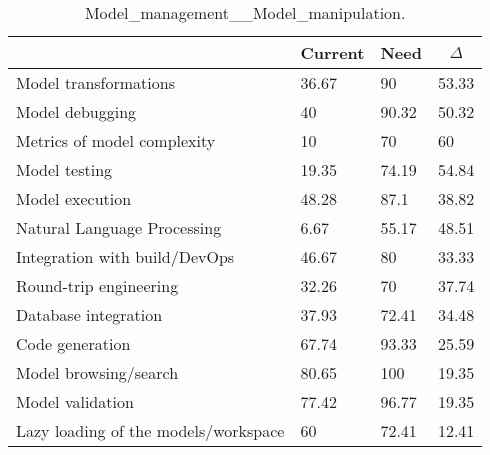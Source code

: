 
  \begin{table*}[]
  \centering
  \notsotiny
  \caption{ Model_management__Model_manipulation.}
\label{tab:model_management__model_manipulation}
\begin{tabular}{|l|l|l|l|}
  \hline
  \rowcolor[HTML]{C0C0C0}
    \multicolumn{1}{|c|}{Feature} & \multicolumn{1}{c|}{Current} & \multicolumn{1}{c|}{Need} & \multicolumn{1}{c|}{$\Delta$} \\ \hline
  Model transformations & 36.67 & 90 & 53.33 \\ \hline 
Model debugging & 40 & 90.32 & 50.32 \\ \hline 
Metrics of model complexity & 10 & 70 & 60 \\ \hline 
Model testing & 19.35 & 74.19 & 54.84 \\ \hline 
Model execution & 48.28 & 87.1 & 38.82 \\ \hline 
Natural Language Processing & 6.67 & 55.17 & 48.51 \\ \hline 
Integration with build/DevOps & 46.67 & 80 & 33.33 \\ \hline 
Round-trip engineering & 32.26 & 70 & 37.74 \\ \hline 
Database integration & 37.93 & 72.41 & 34.48 \\ \hline 
Code generation & 67.74 & 93.33 & 25.59 \\ \hline 
Model browsing/search & 80.65 & 100 & 19.35 \\ \hline 
Model validation & 77.42 & 96.77 & 19.35 \\ \hline 
Lazy loading of the models/workspace & 60 & 72.41 & 12.41 \\ \hline 
\end{tabular}%
  \end{table*}
